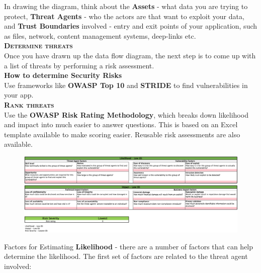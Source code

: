 \documentclass[a5paper,pagesize,10pt,bibtotoc,DIV=10,twoside]{scrbook}
\begin{document}
In drawing the diagram, think about the \textbf{Assets} - what data you are trying to protect, \textbf{Threat Agents} - who the actors are that want to exploit your data, and \textbf{Trust Boundaries} involved - entry and exit points of your application, such as files, network, content management systems, deep-links etc.\\

\textsc{\textbf{Determine threats}}\\

Once you have drawn up the data flow diagram, the next step is to come up with a list of threats by performing a risk assessment.\\

\textbf{How to determine Security Risks}\\

Use frameworks like \textbf{OWASP Top 10} and \textbf{STRIDE} to find vulnerabilities in your app.\\

\textsc{\textbf{Rank threats}}\\

Use the \textbf{OWASP Risk Rating Methodology}, which breaks down likelihood and impact into much easier to answer questions. This is based on an Excel template available to make scoring easier. Reusable risk assessments are also available.

\begin{figure}[H]
\hspace*{-2.5cm}
\includegraphics[scale=0.29]{images/riskassessment}
\end{figure}

Factors for Estimating \textbf{Likelihood} - there are a number of factors that can help determine the likelihood. The first set of factors are related to the threat agent involved:
\end{document}
